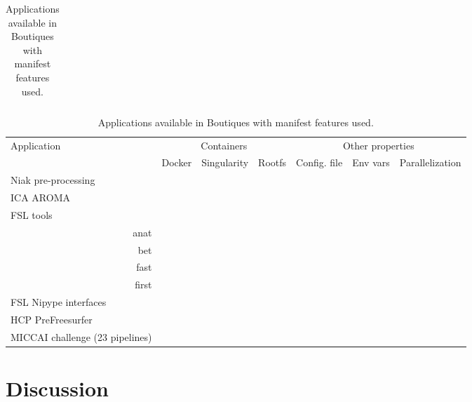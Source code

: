 \documentclass{article}
\begin{document}
\begin{table}
\begin{tabular}{l|ccccccc}
    \end{tabular}
  \vspace*{0.5cm}
  \begin{tabular}{l|ccc|ccc}
    \hline
    \rowcolor[gray]{0.9}
    Application                     &\multicolumn{3}{c|}{Containers}            &  \multicolumn{3}{c}{Other properties}  \\
    \rowcolor[gray]{0.9}
                                    &Docker              & Singularity& Rootfs  & Config. file & Env vars  & Parallelization   \\
    \hline
    Niak pre-processing             &\cellcolor{gray!75} &            &         &              &\cellcolor{gray!75}&\cellcolor{gray!75}\\
    ICA AROMA                       &\cellcolor{gray!75} &            &         &              &&\\
    FSL tools &&&&&\\
    \multicolumn{1}{r|}{anat}       &                    &            &         &              &&\\
    \multicolumn{1}{r|}{bet}        &                    &            &         &              &&\\
    \multicolumn{1}{r|}{fast}       &                    &            &         &              &&\\
    \multicolumn{1}{r|}{first}      &                    &            &         &              &&\\
    FSL Nipype interfaces     \\
    HCP PreFreesurfer               &\cellcolor{gray!75} &            &         &             &&\\
    MICCAI challenge (23 pipelines) &\cellcolor{gray!75} &            &         &             &&\\
  \end{tabular} 
  \caption{Applications available in Boutiques with manifest features used.}
  \label{table:applications}
\end{table}

\section{Discussion}
\end{document}
